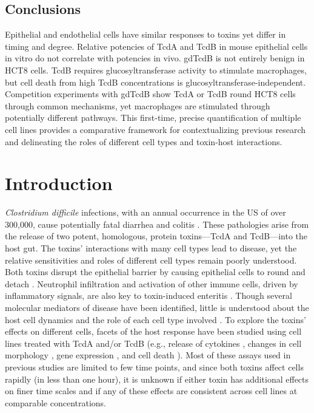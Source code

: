 \subsection{Conclusions}
Epithelial and endothelial cells have similar responses to toxins 
yet differ in timing and degree. Relative potencies of TcdA and 
TcdB in mouse epithelial cells in vitro do not correlate with 
potencies in vivo. gdTcdB is not entirely benign in HCT8 cells. 
TcdB requires glucosyltransferase activity to stimulate macrophages, 
but cell death from high TcdB concentrations is 
glucosyltransferase-independent. Competition experiments with gdTcdB show 
TcdA or TcdB round HCT8 cells through common mechanisms, yet 
macrophages are stimulated through potentially different pathways. 
This first-time, precise quantification of multiple cell lines 
provides a comparative framework for contextualizing previous 
research and delineating the roles of different cell types and 
toxin-host interactions.

\section{Introduction}

\textit{Clostridium difficile} infections, with an annual occurrence in the 
US of over 300,000, cause potentially fatal diarrhea and colitis \cite{Lucado:2012wl}. 
These pathologies arise from the release of two potent, homologous, 
protein toxins—TcdA and TcdB—into the host gut. The toxins' 
interactions with many cell types lead to disease, yet the relative 
sensitivities and roles of different cell types remain poorly 
understood. Both toxins disrupt the epithelial barrier by causing 
epithelial cells to round and detach \cite{Pothoulakis:2000via}. Neutrophil infiltration 
and activation of other immune cells, driven by inflammatory 
signals, are also key to toxin-induced enteritis \cite{Kelly:1994cu}. Though 
several molecular mediators of disease have been identified, 
little is understood about the host cell dynamics and the role 
of each cell type involved \cite{Sun:2010kt,Shen:2012cm}. To explore the toxins' 
effects on different cells, facets of the host response have 
been studied using cell lines treated with TcdA and/or TcdB 
(e.g., release of cytokines \cite{Sun:2010kt,Castagliuolo:1998um,Kelly:1994wd}, changes in cell 
morphology \cite{Grossmann:2000cg,Brito:2002kq}, 
gene expression \cite{DAuria:2012bd,Gerhard:2005dg}, 
and cell death \cite{Solomon:2005dv,Gerhard:2008wz}). 
Most of these assays used in previous studies are limited to 
few time points, and since both toxins affect cells rapidly 
(in less than one hour), it is unknown if either toxin has 
additional effects on finer time scales and if any of these 
effects are consistent across cell lines at comparable concentrations.

